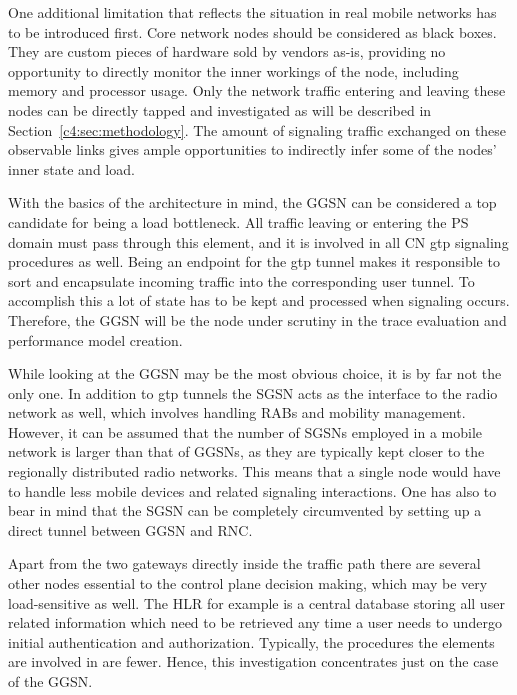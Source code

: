 One additional limitation that reflects the situation in real mobile networks has to be introduced first. 
Core network nodes should be considered as black boxes. They are custom pieces of hardware sold by vendors as-is, providing no opportunity to directly monitor the inner workings of the node, including memory and processor usage. Only the network traffic entering and leaving these nodes can be directly tapped and investigated as will be described in Section~\ref{c4:sec:methodology}. The amount of signaling traffic exchanged on these observable links gives ample opportunities to indirectly infer some of the nodes' inner state and load.

With the basics of the architecture in mind, the \gls{GGSN} can be considered a top candidate for being a load bottleneck. All traffic leaving or entering the \gls{PS} domain must pass through this element, and it is involved in all \gls{CN} \gls{gtp} signaling procedures as well. Being an endpoint for the \gls{gtp} tunnel makes it responsible to sort and encapsulate incoming traffic into the corresponding user tunnel. To accomplish this a lot of state has to be kept and processed when signaling occurs. Therefore, the \gls{GGSN} will be the node under scrutiny in the trace evaluation and performance model creation.

While looking at the \gls{GGSN} may be the most obvious choice, it is by far not the only one. In addition to \gls{gtp} tunnels the \gls{SGSN} acts as the interface to the radio network as well, which involves handling \glspl{RAB} and mobility management. However, it can be assumed that the number of \glspl{SGSN} employed in a mobile network is larger than that of \glspl{GGSN}, as they are typically kept closer to the regionally distributed radio networks. This means that a single node would have to handle less mobile devices and related signaling interactions. One has also to bear in mind that the \gls{SGSN} can be completely circumvented by setting up a direct tunnel between \gls{GGSN} and \gls{RNC}.

Apart from the two gateways directly inside the traffic path there are several other nodes essential to the control plane decision making, which may be very load-sensitive as well. The \gls{HLR} for example is a central database storing all user related information which need to be retrieved any time a user needs to undergo initial authentication and authorization. Typically, the procedures the elements are involved in are fewer. Hence, this investigation concentrates just on the case of the \gls{GGSN}.


